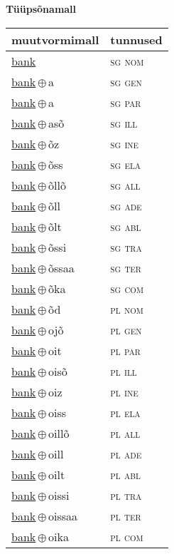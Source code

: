 

\vspace{3.5em}
\noindent \begin{minipage}{\textwidth}
\noindent \textbf{Tüüpsõnamall \,}\\

\begin{sideways}
\begin{tabular}{l l}
muutvormimall & tunnused \\
\hline
\underline{bank} & \textsc{ sg nom } \\
\underline{bank}\,$\oplus$\,a & \textsc{ sg gen } \\
\underline{bank}\,$\oplus$\,a & \textsc{ sg par } \\
\underline{bank}\,$\oplus$\,asõ & \textsc{ sg ill } \\
\underline{bank}\,$\oplus$\,õz & \textsc{ sg ine } \\
\underline{bank}\,$\oplus$\,õss & \textsc{ sg ela } \\
\underline{bank}\,$\oplus$\,õllõ & \textsc{ sg all } \\
\underline{bank}\,$\oplus$\,õll & \textsc{ sg ade } \\
\underline{bank}\,$\oplus$\,õlt & \textsc{ sg abl } \\
\underline{bank}\,$\oplus$\,õssi & \textsc{ sg tra } \\
\underline{bank}\,$\oplus$\,õssaa & \textsc{ sg ter } \\
\underline{bank}\,$\oplus$\,õka & \textsc{ sg com } \\
\underline{bank}\,$\oplus$\,õd & \textsc{ pl nom } \\
\underline{bank}\,$\oplus$\,ojõ & \textsc{ pl gen } \\
\underline{bank}\,$\oplus$\,oit & \textsc{ pl par } \\
\underline{bank}\,$\oplus$\,oisõ & \textsc{ pl ill } \\
\underline{bank}\,$\oplus$\,oiz & \textsc{ pl ine } \\
\underline{bank}\,$\oplus$\,oiss & \textsc{ pl ela } \\
\underline{bank}\,$\oplus$\,oillõ & \textsc{ pl all } \\
\underline{bank}\,$\oplus$\,oill & \textsc{ pl ade } \\
\underline{bank}\,$\oplus$\,oilt & \textsc{ pl abl } \\
\underline{bank}\,$\oplus$\,oissi & \textsc{ pl tra } \\
\underline{bank}\,$\oplus$\,oissaa & \textsc{ pl ter } \\
\underline{bank}\,$\oplus$\,oika & \textsc{ pl com } \\
\end{tabular}
\end{sideways}
\label{tab:tüüpsõnamall-bank}

\end{minipage}

